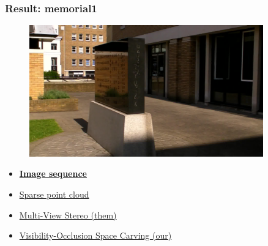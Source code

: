 \documentclass{beamer}
\begin{document}
\begin{frame}
  \frametitle{Result: memorial1}
  \begin{figure}[htb!]
   \centering
   \includegraphics[width=0.9\textwidth]{img/memorial_frame}  %
  \end{figure}
  \begin{itemize}
    \item \href{run:./vid/09-result3-seq.mp4}{\textbf{Image sequence}} \\
    \item \href{run:./vid/10-result3-sparse.mp4}{Sparse point cloud} \\
    \item \href{run:./vid/11-result3-mvs.mp4}{Multi-View Stereo (them)} \\
    \item \href{run:./vid/12-result3-visocc.mp4}{Visibility-Occlusion Space Carving (our)} \\
  \end{itemize}
\end{frame}
\end{document}
